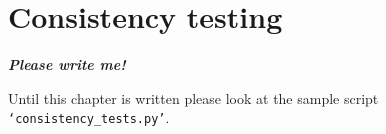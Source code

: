 
\chapter{Consistency testing}

\textbf{\textit{Please write me!}}

Until this chapter is written please look at the sample script \texttt{`consistency\_tests.py'}.
